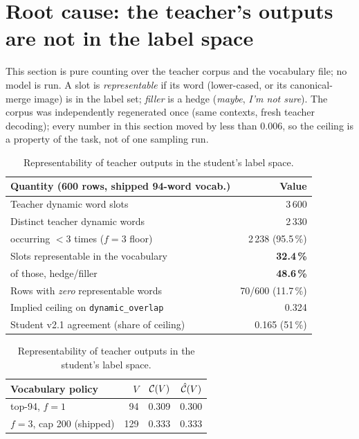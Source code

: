 \section{Root cause: the teacher's outputs are not in the label space}
\label{sec:cause}
This section is pure counting over the teacher corpus and the vocabulary
file; no model is run. A slot is \emph{representable} if its word (lower-cased,
or its canonical-merge image) is in the label set; \emph{filler} is a hedge
(\emph{maybe}, \emph{I'm not sure}). The corpus was independently regenerated
once (same contexts, fresh teacher decoding); every number in this section moved
by less than $0.006$, so the ceiling is a property of the task, not of one
sampling run.

\begin{table}[t]
\centering\footnotesize\setlength{\tabcolsep}{2.5pt}
\begin{minipage}[t]{0.52\textwidth}\centering
\begin{tabular}{@{}lr@{}}
\toprule
Quantity (600 rows, shipped 94-word vocab.) & Value \\
\midrule
Teacher dynamic word slots & 3\,600 \\
Distinct teacher dynamic words & 2\,330 \\
\quad occurring $<3$ times ($f{=}3$ floor) & 2\,238 (95.5\,\%) \\
Slots representable in the vocabulary & \textbf{32.4\,\%} \\
\quad of those, hedge/filler & \textbf{48.6\,\%} \\
Rows with \emph{zero} representable words & 70/600 (11.7\,\%) \\
\midrule
Implied ceiling on \texttt{dynamic\_overlap} & 0.324 \\
Student v2.1 agreement (share of ceiling) & 0.165 (51\,\%) \\
\bottomrule
\end{tabular}
\caption{Representability of teacher outputs in the student's label space.}
\label{tab:repr}
\end{minipage}\hfill
\begin{minipage}[t]{0.46\textwidth}\centering
\begin{tabular}{@{}lrrr@{}}
\toprule
Vocabulary policy & $V$ & $\mathcal{C}(V)$ & $\hat{\mathcal{C}}(V)$ \\
\midrule
top-94, $f{=}1$                &   94 & 0.309 & 0.300 \\
$f{=}3$, cap 200 (shipped) & 129 & 0.333 & 0.333 \\

\end{tabular}
\end{minipage}
\end{table}
